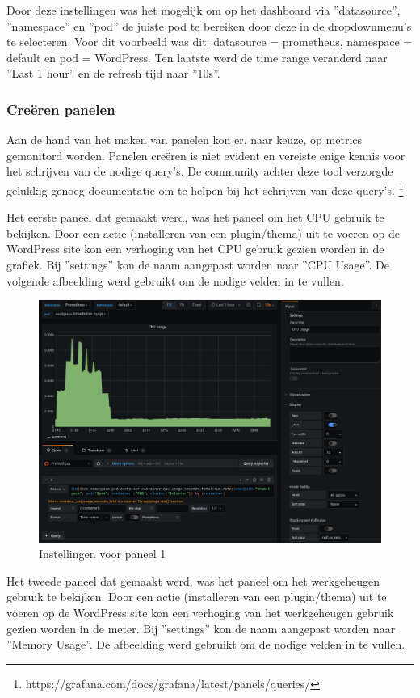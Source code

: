 Door deze instellingen was het mogelijk om op het dashboard via ''datasource'', ''namespace'' en ''pod'' de juiste pod te bereiken door deze in de dropdownmenu's te selecteren. Voor dit voorbeeld was dit: datasource = prometheus, namespace = default en pod = WordPress. Ten laatste werd de time range veranderd naar ''Last 1 hour'' en de refresh tijd naar ''10s''.
\clearpage
\subsubsection{Creëren panelen}

Aan de hand van het maken van panelen kon er, naar keuze, op metrics gemonitord worden. Panelen creëren is niet evident en vereiste enige kennis voor het schrijven van de nodige query's. De community achter deze tool verzorgde gelukkig genoeg documentatie om te helpen bij het schrijven van deze query's. \footnote{https://grafana.com/docs/grafana/latest/panels/queries/}

Het eerste paneel dat gemaakt werd, was het paneel om het CPU gebruik te bekijken. Door een actie (installeren van een plugin/thema) uit te voeren op de WordPress site kon een verhoging van het CPU gebruik gezien worden in de grafiek. Bij ''settings'' kon de naam aangepast worden naar ''CPU Usage''. De volgende afbeelding werd gebruikt om de nodige velden in te vullen. 

\begin{figure}[!hb]
    \centering
        \includegraphics[width=1.1\textwidth]{img/panel1.png}
    \caption{Instellingen voor paneel 1}
\end{figure}


Het tweede paneel dat gemaakt werd, was het paneel om het werkgeheugen gebruik te bekijken. Door een actie (installeren van een plugin/thema) uit te voeren op de WordPress site kon een verhoging van het werkgeheugen gebruik gezien worden in de meter. Bij ''settings'' kon de naam aangepast worden naar ''Memory Usage''. De afbeelding werd gebruikt om de nodige velden in te vullen.

